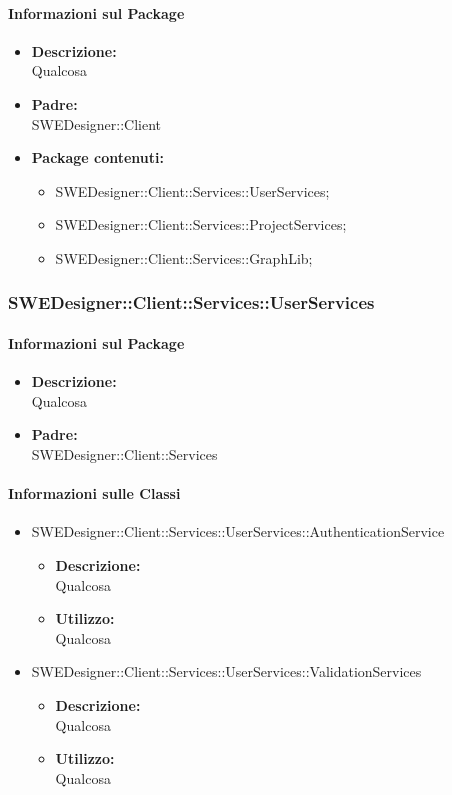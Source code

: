 		\paragraph{Informazioni sul Package}
		\begin{itemize}				
			\item \textbf{Descrizione: }\\
			Qualcosa
			\item \textbf{Padre: }\\ SWEDesigner::Client
			\item \textbf{Package contenuti: }
			\begin{itemize}		
				\item SWEDesigner::Client::Services::UserServices;
				\item SWEDesigner::Client::Services::ProjectServices;
				\item SWEDesigner::Client::Services::GraphLib;
			\end{itemize}
		\end{itemize}
		
	\subsubsection{SWEDesigner::Client::Services::UserServices}
		\paragraph{Informazioni sul Package}
		\begin{itemize}				
			\item \textbf{Descrizione: }\\
			Qualcosa
			\item \textbf{Padre: }\\ SWEDesigner::Client::Services
		\end{itemize}
		
		\paragraph{Informazioni sulle Classi}
		\begin{itemize}
			\item SWEDesigner::Client::Services::UserServices::AuthenticationService
			\begin{itemize}
				\item \textbf{Descrizione: }\\
				Qualcosa
				\item \textbf{Utilizzo: }\\
				Qualcosa
			\end{itemize}
			\item SWEDesigner::Client::Services::UserServices::ValidationServices
			\begin{itemize}
				\item \textbf{Descrizione: }\\
				Qualcosa
				\item \textbf{Utilizzo: }\\
				Qualcosa
			\end{itemize}
		\end{itemize}
		
